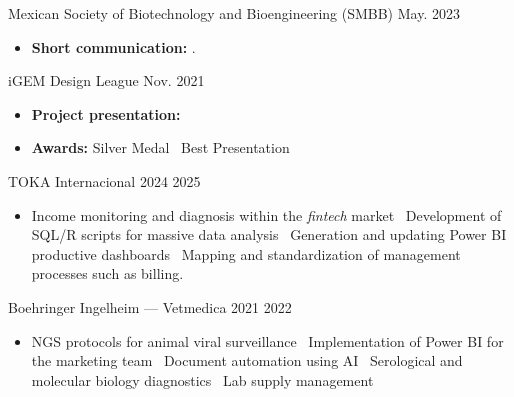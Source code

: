 \documentclass{simplecv}
\newcommand{\mydot}{\raisebox{0.5 ex}{.}\ }
\begin{document}

    {Mexican Society of Biotechnology and Bioengineering (SMBB)} %
    {} %
    {} %
    {May. 2023} %
    {
      \vspace{-0.25cm}
      \begin{itemize}[leftmargin=*]
        \setlength{\itemsep}{0cm}
        \item \textbf{Short communication:} \textcite{olvera-hernandez2023}.
      \end{itemize}
    } %

    {iGEM Design League} %
    {} %
    {} %
    {Nov. 2021} %
    {
        \vspace{-11pt}
        \begin{itemize}[leftmargin=*]
        \setlength{\itemsep}{0cm}
            \item \textbf{Project presentation:}  
            \item \textbf{Awards:} Silver Medal \mydot Best Presentation
        \end{itemize}
    } %


    {TOKA Internacional}
    {}
    {2024}
    {2025}
    {
     \vspace{-11pt}
     \begin{itemize}[leftmargin=*]
     \setlength{\itemsep}{0cm}
         \item Income monitoring and diagnosis within the \textit{fintech} market \mydot Development of SQL/R scripts for massive data analysis \mydot Generation and updating Power BI productive dashboards \mydot Mapping and standardization of management processes such as billing.
     \end{itemize}
    }

        {Boehringer Ingelheim --- Vetmedica}
        {}
        {2021}
        {2022}
        {%
            \vspace{-11pt}
            \begin{itemize}[leftmargin=*]
            \setlength{\itemsep}{0cm}
                \item NGS protocols for animal viral surveillance \mydot Implementation of Power BI for the marketing team \mydot Document automation using AI \mydot Serological and molecular biology diagnostics \mydot Lab supply management
            \end{itemize}
        }
\end{document}
